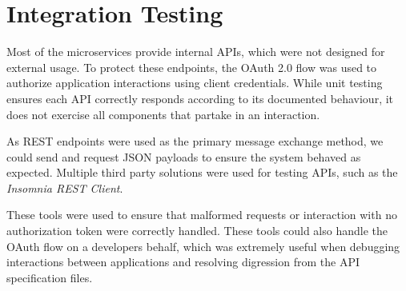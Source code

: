 \section{Integration Testing}
\par
Most of the microservices provide internal APIs, which were not designed for external usage. To protect these endpoints, the OAuth 2.0 flow was used to authorize application interactions using client credentials. While unit testing ensures each API correctly responds according to its documented behaviour, it does not exercise all components that partake in an interaction.

\par
As REST endpoints were used as the primary message exchange method, we could send and request JSON payloads to ensure the system behaved as expected. Multiple third party solutions were used for testing APIs, such as the \textit{Insomnia REST Client}\cite{insomnia}. %

\par
These tools were used to ensure that malformed requests or interaction with no authorization token were correctly handled. These tools could also handle the OAuth flow on a developers behalf, which was extremely useful when debugging interactions between applications and resolving digression from the API specification files.
